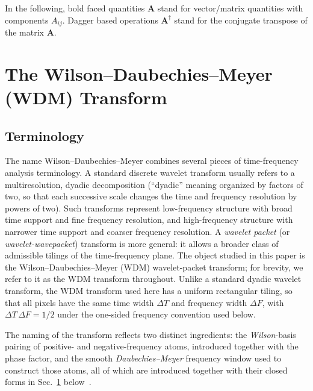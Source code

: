 \documentclass[twocolumn,preprintnumbers,
  superscriptaddress,
  nofootinbib,
  amsmath,
  amssymb,
  aps,
  prd,
  colorlinks=true,
  linkcolor=blue,
  urlcolor=blue,
  citecolor=blue,
  anchorcolor=blue
]{revtex4-2}
\begin{document}
In the following, bold faced quantities $\boldsymbol{A}$ stand for vector/matrix quantities with components $A_{ij}$. Dagger based operations $\boldsymbol{A}^{\dagger}$ stand for the conjugate transpose of the matrix $\boldsymbol{A}$. 

\section{The Wilson--Daubechies--Meyer (WDM) Transform}\label{sec:wdm}

\subsection{Terminology}
The name Wilson--Daubechies--Meyer combines several pieces of time-frequency analysis terminology. A standard discrete wavelet transform usually refers to a multiresolution, dyadic decomposition (``dyadic'' meaning organized by factors of two, so that each successive scale changes the time and frequency resolution by powers of two). Such transforms represent low-frequency structure with broad time support and fine frequency resolution, and high-frequency structure with narrower time support and coarser frequency
resolution.
A \emph{wavelet packet} (or \emph{wavelet-wavepacket}) transform is more general: it allows a broader class of admissible tilings of the time-frequency plane. The object studied in this paper is the Wilson--Daubechies--Meyer (WDM) wavelet-packet transform; for brevity, we refer to it as the WDM transform throughout. Unlike a standard dyadic wavelet transform, the WDM transform used here has a uniform rectangular tiling, so that all pixels have the same time width $\Delta T$ and frequency width $\Delta F$, with $\Delta T\,\Delta F = 1/2$ under the one-sided frequency convention used below.%

The naming of the transform reflects two distinct ingredients: the
\emph{Wilson}-basis pairing of positive- and negative-frequency atoms,
introduced together with the phase factor, and the smooth
\emph{Daubechies--Meyer} frequency window used to
construct those atoms, all of which are introduced together with their closed forms in
Sec.~\ref{sec:wdm} below~\cite{Daubechies:1991wv}.
\end{document}
